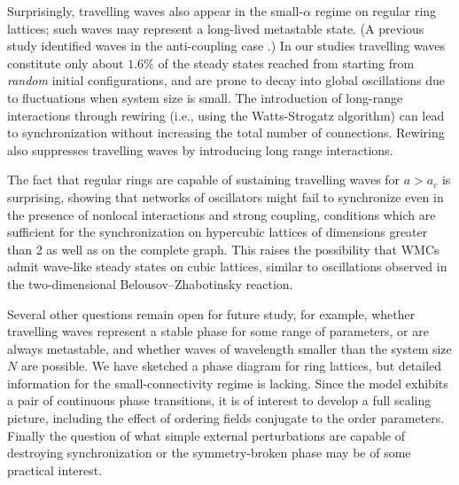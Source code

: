 Surprisingly, travelling waves also appear in the small-$\alpha$ regime on regular ring lattices;  such waves may represent a
long-lived metastable state.  (A previous study identified waves in the anti-coupling case \cite{escaff2014arrays}.) In our studies
travelling waves constitute only about $1.6\%$ of the steady states reached from starting from \textit{random} initial configurations,
and are prone to decay into global oscillations due to fluctuations when system size is small.  The introduction of long-range
interactions through rewiring (i.e., using the Watts-Strogatz algorithm) can lead to synchronization without increasing the total
number of connections.  Rewiring also suppresses travelling waves by introducing long range interactions.

The fact that regular rings are capable of sustaining travelling waves for $a>a_c$ is surprising, showing that networks of oscillators
might fail to synchronize even in the presence of nonlocal interactions and strong coupling, conditions which are sufficient for the
synchronization on hypercubic lattices of dimensions greater than 2 as well as on the complete graph. This raises the possibility that
WMCs admit wave-like steady states on cubic lattices, similar to oscillations observed in the two-dimensional Belousov–Zhabotinsky
reaction.

Several other questions remain open for future study, for example, whether travelling waves represent a stable phase for some range of
parameters, or are always metastable, and whether waves of wavelength smaller than the system size $N$ are possible.  We have sketched
a phase diagram for ring lattices, but detailed information for the small-connectivity regime is lacking.  Since the model exhibits a
pair of continuous phase transitions, it is of interest to develop a full scaling picture, including the effect of ordering fields
conjugate to the order parameters.  Finally the question of what simple external  perturbations are capable of destroying
synchronization or the symmetry-broken phase may be of some practical interest.

